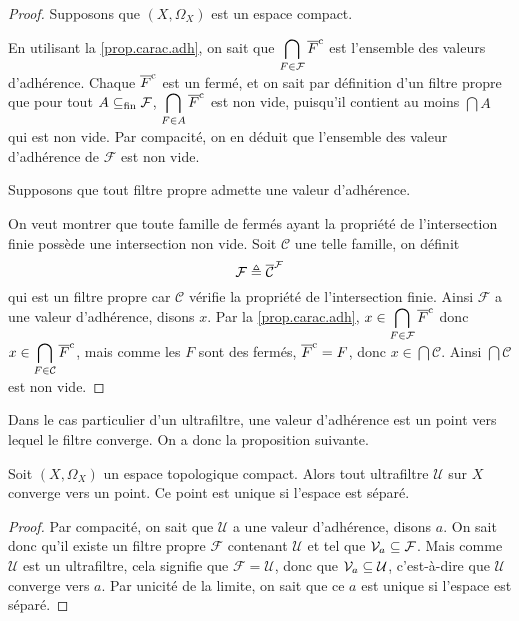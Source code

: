 \begin{proof}
  Supposons que $(X,\Omega_X)$ est un espace compact.
  
  En utilisant la \cref{prop.carac.adh}, on sait que
  $\displaystyle\bigcap_{F\in\mathcal F}\overline{F}^{\mathrm c}$ est l'ensemble des valeurs
  d'adhérence. Chaque $\overline{F}^{\mathrm c}$ est un fermé, et on sait par définition d'un
  filtre propre que pour tout $A\subseteq_{\mathrm{fin}}\mathcal F$,
  $\displaystyle\bigcap_{F\in A}\overline{F}^{\mathrm c}$ est non vide, puisqu'il contient au
  moins $\bigcap A$ qui est non vide. Par compacité, on en déduit que l'ensemble
  des valeur d'adhérence de $\mathcal F$ est non vide.

  Supposons que tout filtre propre admette une valeur d'adhérence.

  On veut montrer que toute famille de fermés ayant la propriété de
  l'intersection finie possède une intersection non vide. Soit $\mathcal C$ une
  telle famille, on définit
  \[\mathcal F \triangleq \overline{\mathcal C}^{\mathcal F}\]
  qui est un filtre propre car $\mathcal C$ vérifie la propriété de
  l'intersection finie. Ainsi $\mathcal F$ a une valeur d'adhérence, disons
  $x$. Par la \cref{prop.carac.adh},
  $\displaystyle x\in\bigcap_{F\in \mathcal F}\overline{F}^{\mathrm c}$ donc
  $\displaystyle x\in\bigcap_{F\in \mathcal C}\overline{F}^{\mathrm c}$, mais comme les $F$ sont
  des fermés, $\overline{F}^{\mathrm c} = F$, donc $x\in \bigcap \mathcal C$. Ainsi
  $\bigcap\mathcal C$ est non vide.
\end{proof}

Dans le cas particulier d'un ultrafiltre, une valeur d'adhérence est un point
vers lequel le filtre converge. On a donc la proposition suivante.

\begin{proposition}
  Soit $(X,\Omega_X)$ un espace topologique compact. Alors tout
  ultrafiltre $\mathcal U$ sur $X$ converge vers un point. Ce point est unique
  si l'espace est séparé.
\end{proposition}

\begin{proof}
  Par compacité, on sait que $\mathcal U$ a une valeur d'adhérence, disons
  $a$. On sait donc qu'il existe un filtre propre $\mathcal F$ contenant
  $\mathcal U$ et tel que $\mathcal{V}_a\subseteq \mathcal F$. Mais comme
  $\mathcal U$ est un ultrafiltre, cela signifie que $\mathcal F = \mathcal U$,
  donc que $\mathcal{V}_a\subseteq\mathcal U$, c'est-à-dire que $\mathcal U$
  converge vers $a$. Par unicité de la limite, on sait que ce $a$ est unique si
  l'espace est séparé.
\end{proof}

